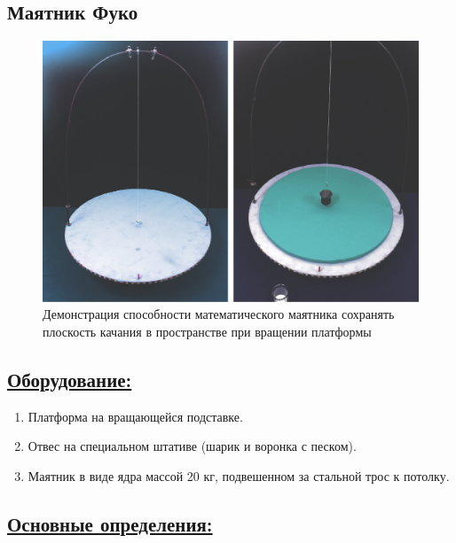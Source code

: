 \documentclass[14pt,a4paper,oneside]{extarticle}	%
\begin{document}
	
	\begin{center}
		\subsection*{Маятник Фуко}
	\end{center}
		

\begin{figure}[H] 	
	\centering 	
	\includegraphics[width=0.9\linewidth]{fuko-1.png}
	\caption{Демонстрация способности математического маятника сохранять плоскость качания в пространстве при вращении платформы}
	\label{fuko-1}
\end{figure}
	
	\subsection*{\underline{Оборудование:}}

		\begin{enumerate}
			\item Платформа на вращающейся подставке.
			\item Отвес на специальном штативе (шарик и воронка с песком).
			\item Маятник в виде ядра массой 20 кг, подвешенном за стальной трос к потолку.
		\end{enumerate}

		\subsection*{\underline{Основные определения:}}
		
\end{document}
